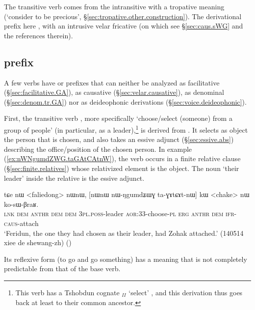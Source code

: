 The transitive verb  comes from the intransitive  with a tropative meaning (`consider to be precious', §\ref{sec:tropative.other.construction}). The derivational prefix here , with an intrusive velar fricative (on which see §\ref{sec:caus.sWG} and the references therein).


\subsection{ prefix  }  \label{sec:GA.non.denom}
A few verbs have  or  prefixes that can neither be analyzed as  facilitative  (§\ref{sec:facilitative.GA}),  as causative (§\ref{sec:velar.causative}), as denominal  (§\ref{sec:denom.tr.GA}) nor as deideophonic derivations (§\ref{sec:voice.deideophonic}). 

First, the transitive verb , more specifically `choose/select (someone) from a group of people' (in particular, as a leader),\footnote{This verb has a Tshobdun cognate $_{II}$  `select' \citep[209]{jackson19tshobdun}, and this derivation thus goes back at least to their common ancestor.
} is derived from . It selects as object the person that is chosen, and also takes an essive adjunct  (§\ref{sec:essive.abs}) describing the office/position of the chosen person. In example (\ref{ex:nWNgumdZWG.taGAtCAtnW}), the verb  occurs in a finite relative clause (§\ref{sec:finite.relatives}) whose relativized element is the object. The noun  `their leader' inside the relative is the essive adjunct.

\begin{exe}
\ex \label{ex:nWNgumdZWG.taGAtCAtnW}
\gll tɕe nɯ <faliedong> nɯnɯ, [nɯnɯ nɯ-ŋgumdʑɯɣ ta-ɣɤtɕɤt-nɯ] kɯ <chake> nɯ ko-sɯ-βraʁ. \\
\textsc{lnk} \textsc{dem}  \textsc{anthr} \textsc{dem} \textsc{dem} \textsc{3pl}.\textsc{poss}-leader \textsc{aor}:3\fl{}3-choose-\textsc{pl} \textsc{erg}  \textsc{anthr} \textsc{dem} \textsc{ifr}-\textsc{caus}-attach \\
\glt `Feridun, the one they had chosen as their leader, had Zohak attached.' (140514 xiee de shewang-zh)
()
\end{exe}

Its reflexive form  (to go and go something) has a meaning that is not completely predictable from that of the base verb.

